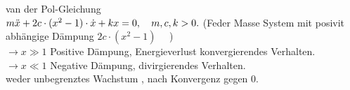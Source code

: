 \documentclass[ngerman]{tudscrreprt}
\begin{document}
\begin{enumerate}[(A)]
\begin{itemize}
van der Pol-Gleichung\\
$m\ddot{x} + 2c\cdot (x^2 -1)\cdot \dot{x} + k x = 0, \quad m,c,k > 0. \\$
(Feder Masse System mit posivit abhängige Dämpung $2c\cdot (x^2 - 1)$ ~~)\\
$\rightarrow x\gg 1 $ Positive Dämpung, Energieverlust konvergierendes Verhalten.\\
$\rightarrow x\ll 1 $ Negative Dämpung, divirgierendes Verhalten.  \\
weder unbegrenztes Wachstum , nach Konvergenz gegen 0.
\begin{figure}[H]  
  \centering
  \def\svgwidth{200pt} 
   
\end{figure} 
\end{itemize}
\end{enumerate}
\end{document}
